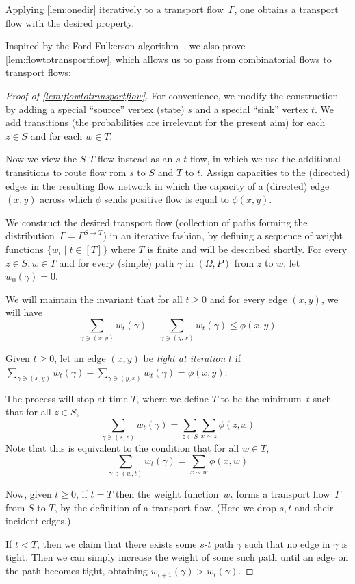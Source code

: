 \documentclass[a4paper, 12p]{article}
\numberwithin{equation}{section}
\begin{document}
Applying \cref{lem:onedir} iteratively to a transport flow~$\Gamma$, one obtains a transport flow with the desired property.

Inspired by the Ford-Fulkerson algorithm~\cite{Fordf56}, we also prove \cref{lem:flowtotransportflow}, which allows us to pass from combinatorial flows to transport flows:
\begin{proof}[Proof of \cref{lem:flowtotransportflow}]
For convenience, we modify the construction by adding a special ``source'' vertex (state) $s$ and a special ``sink'' vertex $t$. We add transitions (the probabilities are irrelevant for the present aim) for each $z \in S$ and for each $w \in T$.  

Now we view the $S$-$T$ flow instead as an $s$-$t$ flow, in which we use the additional transitions to route flow rom $s$ to $S$ and $T$ to $t$. Assign capacities to the (directed) edges in the resulting flow network in which the capacity of a (directed) edge $(x, y)$ across which $\phi$ sends positive flow is equal to $\phi(x,y)$. 

We construct the desired transport flow (collection of paths forming the distribution~$\Gamma = \Gamma^{S\rightarrow T}$) in an iterative fashion, by defining a sequence of weight functions $\{w_t \mid t \in [T]\}$ where $T$ is  finite and will be described shortly. For every $z \in S, w \in T$ and for every (simple) path $\gamma$ in $(\Omega, P)$ from $z$ to $w$, let $w_0(\gamma) = 0$.   

We will maintain the invariant that for all $t\geq 0$ and for every edge $(x, y)$,  we will have
\[\sum_{\gamma \ni (x, y)}w_t(\gamma) - \sum_{\gamma \ni (y, x)}w_t(\gamma)\leq \phi(x, y)\]

Given $t \geq 0$, let an edge $(x, y)$ be \emph{tight at iteration} $t$ if $\sum_{\gamma \ni (x, y)}w_t(\gamma) - \sum_{\gamma \ni (y, x)}w_t(\gamma) = \phi(x, y)$. 

The process will stop at time $T$, where  we define $T$ to be the minimum~$t$ such that
for all $z \in S$, 
\[
    \sum_{\gamma \ni (s,z)}w_t(\gamma) = \sum_{z \in S}\sum_{x \sim z}\phi(z, x)
\]
Note that this is equivalent to the condition that for all $w \in T$,
\[
    \sum_{\gamma \ni (w,t)}w_t(\gamma) = \sum_{x \sim w}\phi(x, w)
\]

Now, given $t \geq 0$, if $t = T$ then the weight function~$w_t$ forms a transport flow~$\Gamma$ from $S$ to $T$, by the definition of a transport flow. (Here we drop $s,t$ and their incident edges.)

If $t < T$, then we claim that there exists some $s$-$t$ path $\gamma$ such that no edge in $\gamma$ is tight. Then we can simply increase the weight of some such path until an edge on the path becomes tight, obtaining $w_{t+1}(\gamma) > w_t(\gamma)$.


\end{proof}
\end{document}
